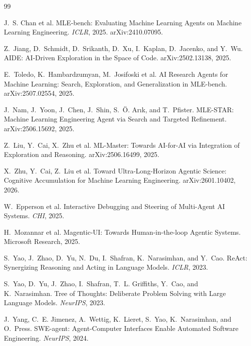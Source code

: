 \documentclass[11pt]{article}
\begin{document}
\begin{thebibliography}{99}

J.~S. Chan et al.
\newblock MLE-bench: Evaluating Machine Learning Agents on Machine Learning
  Engineering.
\newblock \emph{ICLR}, 2025. arXiv:2410.07095.

Z.~Jiang, D.~Schmidt, D.~Srikanth, D.~Xu, I.~Kaplan, D.~Jacenko, and Y.~Wu.
\newblock AIDE: AI-Driven Exploration in the Space of Code.
\newblock arXiv:2502.13138, 2025.

E.~Toledo, K.~Hambardzumyan, M.~Josifoski et al.
\newblock AI Research Agents for Machine Learning: Search, Exploration, and
  Generalization in MLE-bench.
\newblock arXiv:2507.02554, 2025.

J.~Nam, J.~Yoon, J.~Chen, J.~Shin, S.~\"O. Ar{\i}k, and T.~Pfister.
\newblock MLE-STAR: Machine Learning Engineering Agent via Search and Targeted
  Refinement.
\newblock arXiv:2506.15692, 2025.

Z.~Liu, Y.~Cai, X.~Zhu et al.
\newblock ML-Master: Towards AI-for-AI via Integration of Exploration and Reasoning.
\newblock arXiv:2506.16499, 2025.

X.~Zhu, Y.~Cai, Z.~Liu et al.
\newblock Toward Ultra-Long-Horizon Agentic Science: Cognitive Accumulation for
  Machine Learning Engineering.
\newblock arXiv:2601.10402, 2026.

W.~Epperson et al.
\newblock Interactive Debugging and Steering of Multi-Agent AI Systems.
\newblock \emph{CHI}, 2025.

H.~Mozannar et al.
\newblock Magentic-UI: Towards Human-in-the-loop Agentic Systems.
\newblock Microsoft Research, 2025.

S.~Yao, J.~Zhao, D.~Yu, N.~Du, I.~Shafran, K.~Narasimhan, and Y.~Cao.
\newblock ReAct: Synergizing Reasoning and Acting in Language Models.
\newblock \emph{ICLR}, 2023.

S.~Yao, D.~Yu, J.~Zhao, I.~Shafran, T.~L. Griffiths, Y.~Cao, and K.~Narasimhan.
\newblock Tree of Thoughts: Deliberate Problem Solving with Large Language Models.
\newblock \emph{NeurIPS}, 2023.

J.~Yang, C.~E. Jimenez, A.~Wettig, K.~Lieret, S.~Yao, K.~Narasimhan, and O.~Press.
\newblock SWE-agent: Agent-Computer Interfaces Enable Automated Software
  Engineering.
\newblock \emph{NeurIPS}, 2024.


\end{thebibliography}
\end{document}
